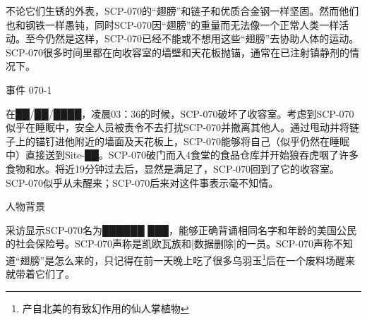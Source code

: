 不论它们生锈的外表，SCP-070的“翅膀”和链子和优质合金钢一样坚固。然而他们也和钢铁一样愚钝，同时SCP-070因“翅膀”的重量而无法像一个正常人类一样活动。至今仍然是这样，SCP-070已经不能或不想用这些“翅膀”去协助人体的运动。SCP-070很多时间里都在向收容室的墙壁和天花板抛锚，通常在已注射镇静剂的情况下。

事件 070-1

在██\slash ██\slash ████，凌晨03：36的时候，SCP-070破坏了收容室。考虑到SCP-070似乎在睡眠中，安全人员被责令不去打扰SCP-070并撤离其他人。通过甩动并将链子上的锚钉进他附近的墙面及天花板上，SCP-070能够将自己（似乎仍然在睡眠中）直接送到Site-██。SCP-070破门而入4食堂的食品仓库并开始狼吞虎咽了许多食物和水。将近19分钟过去后，显然是满足了，SCP-070回到了它的收容室。SCP-070似乎从未醒来；SCP-070后来对这件事表示毫不知情。

人物背景

采访显示SCP-070名为██████ ███，能够正确背诵相同名字和年龄的美国公民的社会保险号。SCP-070声称是凯欧瓦族和{[}数据删除]的一员。SCP-070声称不知道“翅膀”是怎么来的，只记得在前一天晚上吃了很多乌羽玉\footnote{产自北美的有致幻作用的仙人掌植物}后在一个废料场醒来就带着它们了。
